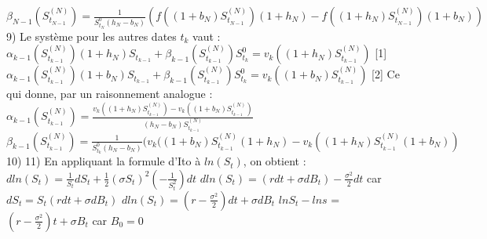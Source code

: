 \documentclass{exam}
\begin{document}
\vspace{0.5cm}
$\beta_{N-1}(S_{t_{N-1}}^{(N)})=\frac{1}{S_{t_N}^0(h_N-b_N)}(f((1+b_N)S_{t_{N-1}}^{(N)})(1+h_N)-f((1+h_N)S_{t_{N-1}}^{(N)})(1+b_N))$
\newline
\vspace{0.5cm}
9) Le système pour les autres dates $t_k$ vaut :
\newline
\vspace{0.5cm}
$\alpha_{k-1}(S_{t_{k-1}}^{(N)})(1 + h_N)S_{t_{k-1}} + \beta_{k-1}(S_{t_{k-1}}^{(N)})S_{t_k}^{0} = v_k((1+h_N)S_{t_{k-1}}^{(N)})$ \hspace{1cm} [1]
\newline
\vspace{0.5cm}
$\alpha_{k-1}(S_{t_{k-1}}^{(N)})(1+b_N)S_{t_{k-1}} + \beta_{k-1}(S_{t_{k-1}}^{(N)})S_{t_k}^{0} = v_k((1+b_N)S_{t_{k-1}}^{(N)})$ \hspace{1cm} [2]
\newline
\vspace{0.5cm}
Ce qui donne, par un raisonnement analogue : 
\newline
\vspace{0.5cm}
$\alpha_{k-1}(S_{t_{k-1}}^{(N)})=\frac{v_k((1+h_N)S_{t_{k-1}}^{(N)})-v_k((1+b_N)S_{t_{k-1}}^{(N)})}{(h_N-b_N)S_{t_{k-1}}^{(N)}}$
\newline
\vspace{0.5cm}
$\beta_{k-1}(S_{t_{k-1}}^{(N)})=\frac{1}{S_{t_k}^0(h_N-b_N)}(v_k((1+b_N)S_{t_{k-1}}^{(N)}(1+h_N)-v_k((1+h_N)S_{t_{k-1}}^{(N)}(1+b_N))$
\newline
\vspace{0.5cm}
10) 
\newline
\vspace{0.5cm}
11) En appliquant la formule d'Ito à $ln (S_t)$, on obtient :
\newline
\espace
$dln(S_t)=\frac{1}{S_t}dS_t + \frac{1}{2}(\sigma S_t)^{2}(-\frac{1}{S_t^{2}})dt$  
\newline
\espace
\Longleftrightarrow \hspace{0.5cm} $dln(S_t)=(r dt + \sigma dB_t)-\frac{\sigma^{2}}{2} dt$ \hspace{0.5cm} car \hspace{0.5cm} $dS_t=S_t(rdt + \sigma dB_t)$
\newline
\espace
\Longleftrightarrow \hspace{0.5cm} $dln(S_t)=(r-\frac{\sigma^2}{2})dt + \sigma dB_t$
\newline
\espace
\Longleftrightarrow \hspace{0.5cm} $lnS_t - lns$ = $(r-\frac{\sigma^2}{2})t + \sigma B_t$ \hspace{0.5cm} car $B_0=0$
\end{document}
